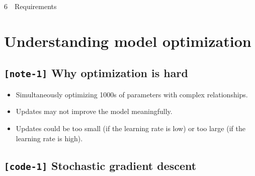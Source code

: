 \documentclass[11pt, twoside]{article}
\begin{document}
{{6~~}Requirements}

    \hypertarget{understanding-model-optimization}{%
\section{Understanding model
optimization}\label{understanding-model-optimization}}

    \hypertarget{note-1-why-optimization-is-hard}{%
\subsection{\texorpdfstring{\texttt{{[}note-1{]}} Why optimization is
hard}{{[}note-1{]} Why optimization is hard}}\label{note-1-why-optimization-is-hard}}

\begin{itemize}
\item
  Simultaneously optimizing 1000s of parameters with complex
  relationships.
\item
  Updates may not improve the model meaningfully.
\item
  Updates could be too small (if the learning rate is low) or too large
  (if the learning rate is high).
\end{itemize}

    \hypertarget{code-1-stochastic-gradient-descent}{%
\subsection{\texorpdfstring{\texttt{{[}code-1{]}} Stochastic gradient
descent}{{[}code-1{]} Stochastic gradient descent}}\label{code-1-stochastic-gradient-descent}}
\end{document}

